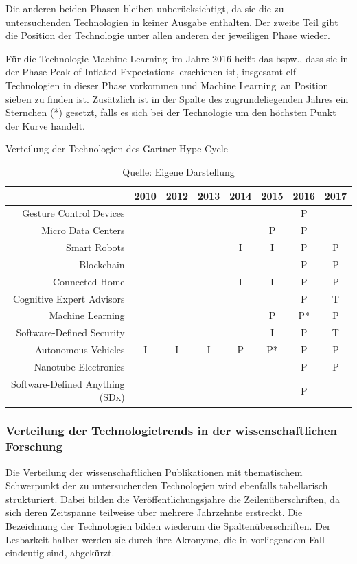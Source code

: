 Die anderen beiden Phasen bleiben unberücksichtigt, da sie die zu untersuchenden Technologien in keiner Ausgabe enthalten. Der zweite Teil gibt die Position der Technologie unter allen anderen der jeweiligen Phase wieder.

Für die Technologie \glqq Machine Learning\grqq~im Jahre 2016 heißt das bspw., dass sie in der Phase \glqq Peak of Inflated Expectations\grqq~erschienen ist, insgesamt elf Technologien in dieser Phase vorkommen und \glqq Machine Learning\grqq~an Position sieben zu finden ist. Zusätzlich ist in der Spalte des zugrundeliegenden Jahres ein Sternchen (*) gesetzt, falls es sich bei der Technologie um den höchsten Punkt der Kurve handelt.

\begin{table}
	\caption{Verteilung der Technologien des \glqq Gartner Hype Cycle\grqq}
	\label{tab:dist_ghc}
\begin{tabular}{r|c|c|c|c|c|c|c|}
	& 2010 & 2012 & 2013 & 2014 & 2015 & 2016 & 2017 \\ 
	\hline 
	Gesture Control Devices &  &  &  &  &  & P &  \\ 
	\hline 
	Micro Data Centers &  &  &  &  & P & P &  \\ 
	\hline 
	Smart Robots &  &  &  & I & I & P & P \\ 
	\hline 
	Blockchain &  &  &  &  &  & P & P \\ 
	\hline 
	Connected Home &  &  &  & I & I & P & P \\ 
	\hline 
	Cognitive Expert Advisors &  &  &  &  &  & P & T \\ 
	\hline 
	Machine Learning &  &  &  &  & P & P* & P \\ 
	\hline 
	Software-Defined Security &  &  &  &  & I & P & T \\ 
	\hline 
	Autonomous Vehicles & I & I & I & P & P* & P & P \\ 
	\hline 
	Nanotube Electronics &  &  &  &  &  & P & P \\ 
	\hline 
	Software-Defined Anything (SDx) &  &  &  &  &  & P &  \\ 
	\hline
\end{tabular}
\caption*{Quelle: Eigene Darstellung}
\end{table}

\subsubsection{Verteilung der Technologietrends in der wissenschaftlichen Forschung}
Die Verteilung der wissenschaftlichen Publikationen mit thematischem Schwerpunkt der zu untersuchenden Technologien wird ebenfalls tabellarisch strukturiert. Dabei bilden die Veröffentlichungsjahre die Zeilenüberschriften, da sich deren Zeitspanne teilweise über mehrere Jahrzehnte erstreckt. Die Bezeichnung der Technologien bilden wiederum die Spaltenüberschriften. Der Lesbarkeit halber werden sie durch ihre Akronyme, die in vorliegendem Fall eindeutig sind, abgekürzt.

